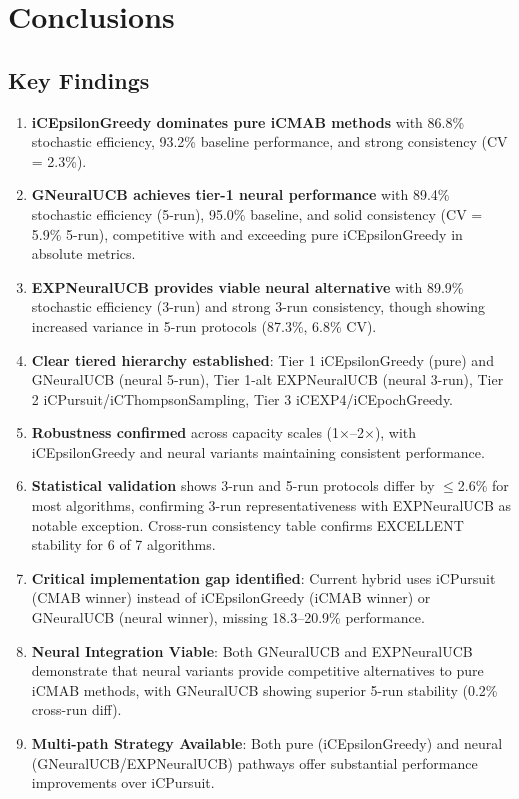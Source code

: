 \documentclass[12pt,a4paper]{article}
\newcommand{\primarytext}[1]{\textcolor{primaryblue}{\textbf{#1}}}
\newcommand{\secondarytext}[1]{\textcolor{secondaryblue}{\textbf{#1}}}
\newcommand{\success}[1]{\textcolor{accentgreen}{\textbf{#1}}}
\newcommand{\warning}[1]{\textcolor{warningred}{\textbf{#1}}}
\newcommand{\legacy}[1]{\textcolor{legacycolor}{\textbf{#1}}}
\newcommand{\neural}[1]{\textcolor{neuralcolor}{\textbf{#1}}}
\begin{document}
\newpage
\section{Conclusions}

\subsection{Key Findings}
\begin{enumerate}
\item \primarytext{iCEpsilonGreedy dominates pure iCMAB methods} with 86.8\% stochastic efficiency, 93.2\% baseline performance, and strong consistency (CV = 2.3\%).
\item \neural{GNeuralUCB achieves tier-1 neural performance} with 89.4\% stochastic efficiency (5-run), 95.0\% baseline, and solid consistency (CV = 5.9\% 5-run), competitive with and exceeding pure iCEpsilonGreedy in absolute metrics.
\item \legacy{EXPNeuralUCB provides viable neural alternative} with 89.9\% stochastic efficiency (3-run) and strong 3-run consistency, though showing increased variance in 5-run protocols (87.3\%, 6.8\% CV).
\item \secondarytext{Clear tiered hierarchy established}: Tier 1 iCEpsilonGreedy (pure) and GNeuralUCB (neural 5-run), Tier 1-alt EXPNeuralUCB (neural 3-run), Tier 2 iCPursuit/iCThompsonSampling, Tier 3 iCEXP4/iCEpochGreedy.
\item \success{Robustness confirmed} across capacity scales (1$\times$--2$\times$), with iCEpsilonGreedy and neural variants maintaining consistent performance.
\item \success{Statistical validation} shows 3-run and 5-run protocols differ by $\leq$2.6\% for most algorithms, confirming 3-run representativeness with EXPNeuralUCB as notable exception. Cross-run consistency table confirms EXCELLENT stability for 6 of 7 algorithms.
\item \warning{Critical implementation gap identified}: Current hybrid uses iCPursuit (CMAB winner) instead of iCEpsilonGreedy (iCMAB winner) or GNeuralUCB (neural winner), missing 18.3--20.9\% performance.
\item \neural{Neural Integration Viable}: Both GNeuralUCB and EXPNeuralUCB demonstrate that neural variants provide competitive alternatives to pure iCMAB methods, with GNeuralUCB showing superior 5-run stability (0.2\% cross-run diff).
\item \success{Multi-path Strategy Available}: Both pure (iCEpsilonGreedy) and neural (GNeuralUCB/EXPNeuralUCB) pathways offer substantial performance improvements over iCPursuit.
\end{enumerate}
\end{document}

